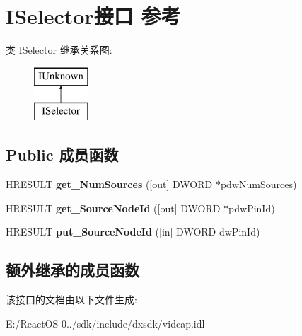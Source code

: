 \hypertarget{interface_i_selector}{}\section{I\+Selector接口 参考}
\label{interface_i_selector}
类 I\+Selector 继承关系图\+:\begin{figure}[H]
\begin{center}
\leavevmode
\includegraphics[height=2.000000cm]{interface_i_selector}
\end{center}
\end{figure}
\subsection*{Public 成员函数}
\begin{DoxyCompactItemize}
\item 
\mbox{\label{interface_i_selector_af75c0d6bfec28f2824477f7515fcdbd4}} 
H\+R\+E\+S\+U\+LT {\bfseries get\+\_\+\+Num\+Sources} (\mbox{[}out\mbox{]} D\+W\+O\+RD $\ast$pdw\+Num\+Sources)
\item 
\mbox{\label{interface_i_selector_ab206eb58cfecf4f0a71296d2089be50e}} 
H\+R\+E\+S\+U\+LT {\bfseries get\+\_\+\+Source\+Node\+Id} (\mbox{[}out\mbox{]} D\+W\+O\+RD $\ast$pdw\+Pin\+Id)
\item 
\mbox{\label{interface_i_selector_aed48f805f8736a3ddb9f48b70b637986}} 
H\+R\+E\+S\+U\+LT {\bfseries put\+\_\+\+Source\+Node\+Id} (\mbox{[}in\mbox{]} D\+W\+O\+RD dw\+Pin\+Id)
\end{DoxyCompactItemize}
\subsection*{额外继承的成员函数}


该接口的文档由以下文件生成\+:\begin{DoxyCompactItemize}
\item 
E\+:/\+React\+O\+S-\/0../sdk/include/dxsdk/vidcap.\+idl\end{DoxyCompactItemize}
